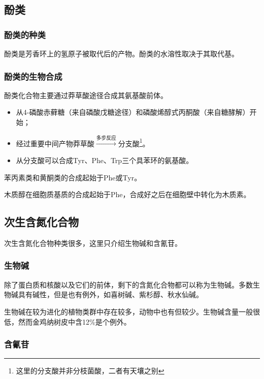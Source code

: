 \subsection{酚类}

\subsubsection{酚类的种类}

酚类是芳香环上的氢原子被取代后的产物。酚类的水溶性取决于其取代基。

\subsubsection{酚类的生物合成}

酚类化合物主要通过莽草酸途径合成其氨基酸前体。

\begin{itemize}
	\item 从4-磷酸赤藓糖（来自磷酸戊糖途径）和磷酸烯醇式丙酮酸（来自糖酵解）开始；
	\item 经过重要中间产物莽草酸$\xrightarrow{\text{多步反应}}$分支酸\footnote{这里的分支酸{\color{red}并非}分枝菌酸，二者有天壤之别}。
	\item 从分支酸可以合成Tyr、Phe、Trp三个具苯环的氨基酸。
\end{itemize}

苯丙素类和黄酮类的合成起始于Phe或Tyr。

木质醇在细胞质基质的合成起始于Phe，合成好之后在细胞壁中转化为木质素。

\subsection{次生含氮化合物}

次生含氮化合物种类很多，这里只介绍生物碱和含氰苷。

\subsubsection{生物碱}

除了蛋白质和核酸以及它们的前体，剩下的含氮化合物都可以称为生物碱。多数生物碱具有碱性，但是也有例外，如喜树碱、紫杉醇、秋水仙碱。

生物碱在较为进化的植物类群中存在较多，动物中也有但较少。生物碱含量一般很低，然而金鸡纳树皮中含12\%是个例外。

\subsubsection{含氰苷}


